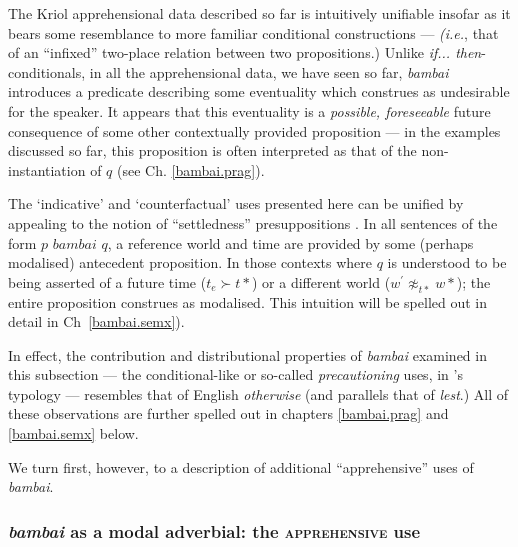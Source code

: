 \xe

The Kriol apprehensional data described so far is intuitively unifiable insofar as it bears some resemblance to more familiar conditional constructions --- \textit{(i.e.}, that of an ``infixed'' two-place relation between two propositions.) Unlike \textit{if... then}-conditionals, in all the apprehensional data, we have seen so far, \textit{bambai} introduces a predicate describing some eventuality which construes as undesirable for the speaker. It appears that this eventuality is a \textit{possible, foreseeable} future consequence of some other contextually provided proposition --- in the examples discussed so far, this proposition is often interpreted as that of the non-instantiation of $ q $ (see Ch. \ref{bambai.prag}). 

The `indicative' and `counterfactual' uses presented here can be unified by appealing to the notion of ``settledness'' presuppositions \citep[\textit{e.g.,}][82, \textit{passim}]{Condoravdi2002}. In all sentences of the form $ p \textit{ bambai }q$, a reference world and time are provided by some (perhaps modalised) antecedent proposition. In those contexts where $ q $ is understood to be being asserted of a future time ($t_e\succ t*$) or a different world ($w^\prime\not\approx_{t*} w*$); 
 the entire proposition construes as modalised. This intuition will be spelled out in detail in Ch~\ref{bambai.semx}).  %

In effect, the contribution and distributional properties of \textit{bambai} examined in this subsection --- the conditional-like or so-called \textit{precautioning} uses, in \citeauthor{Lichtenberk1995}'s typology --- resembles that of English \textit{otherwise} (and parallels that of \textit{lest}.)
All of these observations are further spelled out in chapters \ref{bambai.prag} and \ref{bambai.semx} below. 

We turn first, however, to a description of additional ``apprehensive'' uses of \textit{bambai}.

\subsubsection[Apprehensive uses]{\textit{bambai} as a modal adverbial: the \textsc{apprehensive} use}
\label{ep.adv}

